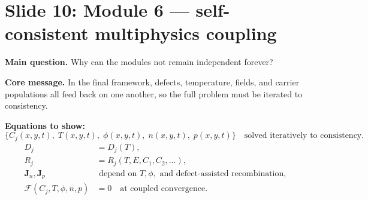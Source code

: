 \documentclass[11pt]{article}
\begin{document}
\section{Slide 10: Module 6 --- self-consistent multiphysics coupling}
\begin{physicsbox}
\textbf{Main question.} Why can the modules not remain independent forever?
\end{physicsbox}

\textbf{Core message.} In the final framework, defects, temperature, fields, and carrier populations all feed back on one another, so the full problem must be iterated to consistency.

\textbf{Equations to show:}
\begin{equation*}
\{C_j(x,y,t),\; T(x,y,t),\; \phi(x,y,t),\; n(x,y,t),\; p(x,y,t)\}
\quad \text{solved iteratively to consistency.}
\end{equation*}
\begin{align*}
D_j &= D_j(T),\\
R_j &= R_j(T,E,C_1,C_2,\dots),\\
\bm{J}_n,\bm{J}_p &\text{ depend on } T,\phi,\text{ and defect-assisted recombination},\\
\mathcal{F}(C_j,T,\phi,n,p)&=0 \quad \text{at coupled convergence}.
\end{align*}
\end{document}
